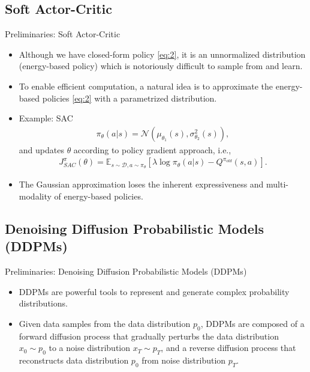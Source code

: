 \documentclass[aspectratio=169,xcolor=dvipsnames]{beamer}
\newcommand{\bE}{\mathbb{E}}
\newcommand{\cD}{\mathcal{D}}
\newcommand{\lm}{\lambda}
\newcommand{\te}{\theta}
\newcommand{\nal}[1]{\begin{align*}#1\end{align*}}
\newcommand{\cN}{\mathcal{N}}
\begin{document}
\subsection{Soft Actor-Critic}
\begin{frame}{Preliminaries: Soft Actor-Critic \cite{haarnoja2018soft}}
\begin{itemize}
 \item Although we have closed-form policy \eqref{eq:2}, it is an unnormalized distribution (energy-based policy) which is notoriously difficult to sample from and learn. 
 \item To enable efficient computation, a natural idea is
 to approximate the energy-based policies \eqref{eq:2} with a parametrized distribution.
 \item Example: SAC
    \nal{
        \pi_{\te}(a|s)=\cN(\mu_{\te_1}(s),\sigma_{\te_2}^2(s)),
    }
 and updates $\te$ according to policy gradient approach, i.e.,
 \nal{
    J^{\pi}_{SAC}(\te) = \bE_{s\sim \cD, a\sim\pi_{\te}}[\lm\log\pi_{\te}(a|s)-Q^{\pi_{old}}(s,a)].
 }
 \item \alert{The Gaussian approximation loses the inherent expressiveness and multi-modality of energy-based policies.}
 \end{itemize}
\end{frame}

\subsection{Denoising Diffusion Probabilistic Models (DDPMs)}
\begin{frame}{Preliminaries: Denoising Diffusion Probabilistic Models (DDPMs)}
\begin{itemize}
 \item DDPMs are powerful tools to represent and generate complex probability distributions. 
 \item Given data samples from the data distribution $p_0$, DDPMs are composed of a forward diffusion process that gradually perturbs the data distribution $x_0\sim p_0$ to a noise distribution $x_T\sim p_T$, and a reverse diffusion process that reconstructs data distribution $p_0$ from noise distribution $p_T$.
 \end{itemize}
\end{frame}
\end{document}
